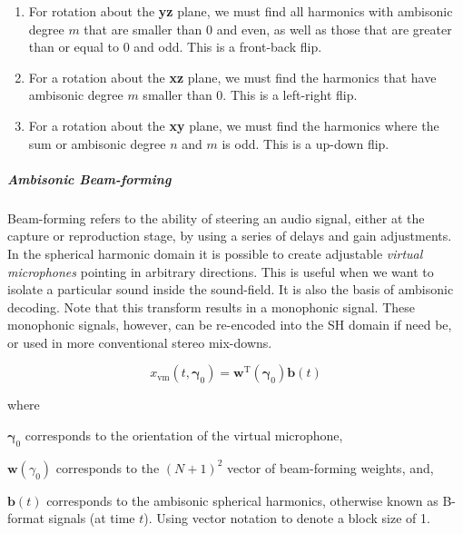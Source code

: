 \begin{enumerate}
    \item For rotation about the \textbf{yz} plane, we must find all harmonics with ambisonic degree $m$ that are smaller than 0 and even, as well as those that are greater than or equal to 0 and odd. This is a front-back flip.
    \item For a rotation about the \textbf{xz} plane, we must find the harmonics that have ambisonic degree $m$ smaller than 0.  This is a left-right flip.
    \item For a rotation about the \textbf{xy} plane, we must find the harmonics where the sum or ambisonic degree $n$ and $m$ is odd.  This is a up-down flip.
\end{enumerate}

\subparagraph{Ambisonic Beam-forming}

Beam-forming refers to the ability of steering an audio signal, either at the capture or reproduction stage, by using a series of delays and gain adjustments. In the spherical harmonic domain it is possible to create adjustable \textit{virtual microphones} pointing in arbitrary directions. This is useful when we want to isolate a particular sound inside the sound-field. It is also the basis of ambisonic decoding. Note that this transform results in a monophonic signal. These monophonic signals, however, can be re-encoded into the SH domain if need be, or used in more conventional stereo mix-downs.

\begin{equation}
x_{\mathrm{vm}}\left(t, \boldsymbol{\gamma}_{0}\right)=\mathbf{w}^{\mathrm{T}}\left(\boldsymbol{\gamma}_{0}\right) \mathbf{b}(t)
\label{eq:ambi-beamform}
\end{equation}

\noindent where
\begin{description}
\item  $\boldsymbol{\gamma}_{0}$ corresponds to the orientation of the virtual microphone,
\item  $\mathbf{w}(\gamma_{0})$ corresponds to the $(N+1)^{2}$ vector of beam-forming weights, and,
\item  $\mathbf{b}(t)$ corresponds to the ambisonic spherical harmonics, otherwise known as B-format signals (at time $t$). Using vector notation to denote a block size of 1.
\end{description}


